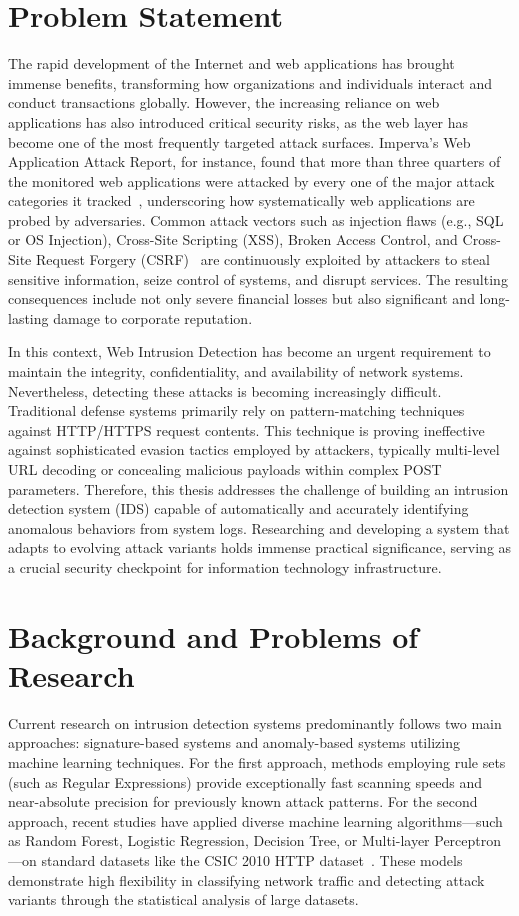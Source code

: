 \documentclass[../main.tex]{subfiles}
\begin{document}
\section{Problem Statement}
\label{sec:dvd}
The rapid development of the Internet and web applications has brought immense benefits, transforming how organizations and individuals interact and conduct transactions globally. However, the increasing reliance on web applications has also introduced critical security risks, as the web layer has become one of the most frequently targeted attack surfaces. Imperva's Web Application Attack Report, for instance, found that more than three quarters of the monitored web applications were attacked by every one of the major attack categories it tracked~\cite{imperva}, underscoring how systematically web applications are probed by adversaries. Common attack vectors such as injection flaws (e.g., SQL or OS Injection), Cross-Site Scripting (XSS), Broken Access Control, and Cross-Site Request Forgery (CSRF)~\cite{owasp2021} are continuously exploited by attackers to steal sensitive information, seize control of systems, and disrupt services. The resulting consequences include not only severe financial losses but also significant and long-lasting damage to corporate reputation.

In this context, Web Intrusion Detection has become an urgent requirement to maintain the integrity, confidentiality, and availability of network systems. Nevertheless, detecting these attacks is becoming increasingly difficult. Traditional defense systems primarily rely on pattern-matching techniques against HTTP/HTTPS request contents. This technique is proving ineffective against sophisticated evasion tactics employed by attackers, typically multi-level URL decoding or concealing malicious payloads within complex POST parameters. Therefore, this thesis addresses the challenge of building an intrusion detection system (IDS) capable of automatically and accurately identifying anomalous behaviors from system logs. Researching and developing a system that adapts to evolving attack variants holds immense practical significance, serving as a crucial security checkpoint for information technology infrastructure.


\section{Background and Problems of Research} 
\label{sec:giaiphap}
Current research on intrusion detection systems predominantly follows two main approaches: signature-based systems and anomaly-based systems utilizing machine learning techniques. For the first approach, methods employing rule sets (such as Regular Expressions) provide exceptionally fast scanning speeds and near-absolute precision for previously known attack patterns. For the second approach, recent studies have applied diverse machine learning algorithms—such as Random Forest, Logistic Regression, Decision Tree, or Multi-layer Perceptron—on standard datasets like the CSIC 2010 HTTP dataset~\cite{csic2010,pham2016,rawashdeh2023}. These models demonstrate high flexibility in classifying network traffic and detecting attack variants through the statistical analysis of large datasets.
\end{document}
